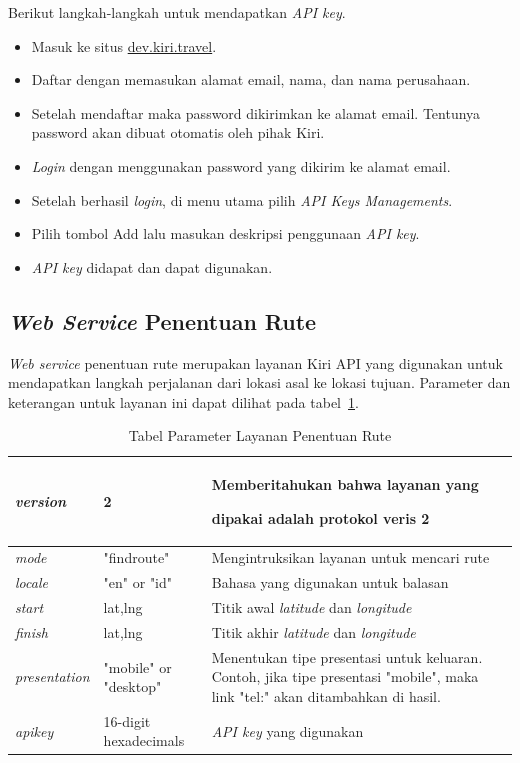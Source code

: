 Berikut langkah-langkah untuk mendapatkan \textit{API key}.
\begin{itemize}
	\item Masuk ke situs \url{dev.kiri.travel}.
	\item Daftar dengan memasukan alamat email, nama, dan nama perusahaan.
	\item Setelah mendaftar maka password dikirimkan ke alamat email. Tentunya password akan dibuat otomatis oleh pihak Kiri.
	\item \textit{Login} dengan menggunakan password yang dikirim ke alamat email. 
	\item Setelah berhasil \textit{login}, di menu utama pilih \textit{API Keys Managements}.
	\item Pilih tombol Add lalu masukan deskripsi penggunaan \textit{API key}.
	\item \textit{API key} didapat dan dapat digunakan.
\end{itemize}

\subsection{\textit{Web Service} Penentuan Rute}
\label{subsec:Web Service Penentuan Rute}
\hspace{0.5cm} \textit{Web service} penentuan rute merupakan layanan Kiri API yang digunakan untuk mendapatkan langkah perjalanan dari lokasi asal ke lokasi tujuan. Parameter dan keterangan untuk layanan ini dapat dilihat pada tabel~\ref{tab:routingWebService}.

\begin{table}[H]
	\centering
		\begin{tabular}{|p{2cm}|p{4cm}|p{8cm}|}
			\hline
			\textit{version} & 2 & Memberitahukan bahwa layanan yang \strut dipakai adalah protokol veris 2 \\ \hline
			\textit{mode} & "findroute" & Mengintruksikan layanan untuk mencari rute \\ \hline
			\textit{locale} & "en" or "id" & Bahasa yang digunakan untuk balasan \\ \hline
			\textit{start} & lat,lng & Titik awal \textit{latitude} dan \textit{longitude} \\ \hline
			\textit{finish} & lat,lng & Titik akhir \textit{latitude} dan \textit{longitude}  \\ \hline
			\textit{presentation} & "mobile" or "desktop" & Menentukan tipe presentasi untuk keluaran. Contoh, jika tipe presentasi "mobile", maka link "tel:" akan ditambahkan di hasil. \\ \hline
			\textit{apikey} & 16-digit hexadecimals & \textit{API key} yang digunakan \\ \hline
			\hline
		\end{tabular}
	\caption{Tabel Parameter Layanan Penentuan Rute}
	\label{tab:routingWebService}
\end{table}

